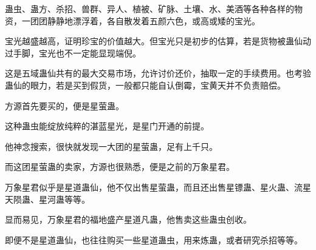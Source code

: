 \begin{this_body}
蛊虫、蛊方、杀招、兽群、异人、植被、矿脉、土壤、水、美酒等各种各样的物资，一团团静静地漂浮着，各自散发着五颜六色，或高或矮的宝光。

宝光越盛越高，证明珍宝的价值越大。但宝光只是初步的估算，若是货物被蛊仙动过手脚，宝光也不一定能显现端倪。

这是五域蛊仙共有的最大交易市场，允许讨价还价，抽取一定的手续费用。也考验蛊仙的眼力，若是买到假货，一般都只能自认倒霉，宝黄天并不负责赔偿。

方源首先要买的，便是星萤蛊。

这种蛊虫能绽放纯粹的湛蓝星光，是星门开通的前提。

他神念搜索，很快就发现一大团的星萤蛊，足有上千只。

而这团星萤蛊的卖家，方源也很熟悉，便是之前的万象星君。

万象星君似乎是星道蛊仙，他不仅出售星萤蛊，而且还出售星镖蛊、星火蛊、流星天陨蛊、星河蛊等等。

显而易见，万象星君的福地盛产星道凡蛊，他售卖这些蛊虫创收。

即便不是星道蛊仙，也往往购买一些星道蛊虫，用来炼蛊，或者研究杀招等等。

\end{this_body}

